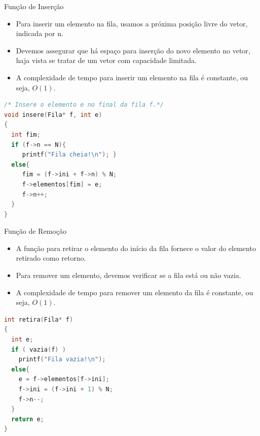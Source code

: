 \begin{frame}[fragile]{Função de Inserção}  
	\begin{itemize}
		\item Para inserir um elemento na fila, usamos a próxima posição 
		livre do vetor, indicada por \alert{n}.
		\item Devemos assegurar que há espaço para inserção do novo 
		elemento no vetor, haja vista se tratar de um vetor com capacidade limitada. 
		\item A complexidade de tempo para inserir um elemento na fila 
		é constante, ou seja, $O(1)$.
	\end{itemize}
\footnotesize
\begin{lstlisting}[language=C]
/* Insere o elemento e no final da fila f.*/
void insere(Fila* f, int e)
{
  int fim;
  if (f->n == N){
     printf("Fila cheia!\n"); }
  else{
     fim = (f->ini + f->n) % N;
     f->elementos[fim] = e;  
     f->n++;
  }
}
\end{lstlisting}	
\end{frame}

\begin{frame}[fragile]{Função de Remoção} 
	\begin{itemize}
		\item A função para retirar o elemento do 
		início da fila fornece o valor do elemento retirado 
		como retorno.
		\item Para remover um elemento, devemos verificar se 
		a fila está ou não vazia.
		\item A complexidade de tempo para remover 
		um elemento da fila é constante, ou seja, $O(1)$.
	\end{itemize}
	
\footnotesize
\begin{lstlisting}[language=C]
int retira(Fila* f)
{
  int e;
  if ( vazia(f) )
    printf("Fila vazia!\n");
  else{
    e = f->elementos[f->ini];
    f->ini = (f->ini + 1) % N;
    f->n--;
  }
  return e;
}
\end{lstlisting}	
\end{frame} 

%

